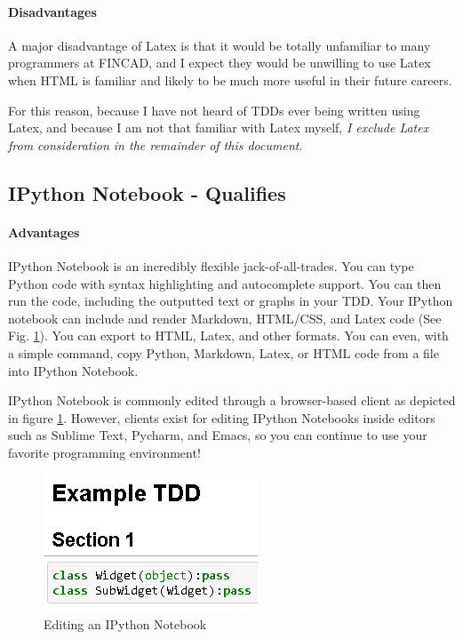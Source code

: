 \documentclass[]{article}
\begin{document}
	\paragraph{Disadvantages}	
	A major disadvantage of Latex is that it would be totally unfamiliar to many programmers at FINCAD, 
	and I expect they would be unwilling to use Latex when HTML is familiar and likely to be much more useful in their future careers.
	
	For this reason, because I have not heard of TDDs ever being written using Latex, and because I am not that familiar with Latex myself, 
	\emph{I exclude Latex from consideration in the remainder of this document}.


\subsection{IPython Notebook - Qualifies}
	\paragraph{Advantages}
		IPython Notebook is an incredibly flexible jack-of-all-trades.  
		You can type Python code with syntax highlighting and autocomplete support. 
		You can then run the code, including the outputted text or graphs in your TDD.  
		Your IPython notebook can include and render Markdown, HTML/CSS, and Latex code (See Fig. \ref{IPython}).  
		You can export to HTML, Latex, and other formats.  
		You can even, with a simple command, copy Python, Markdown, Latex, or HTML code from a file into IPython Notebook.
		
		IPython Notebook is commonly edited through a browser-based client as depicted in figure \ref{IPython}.  However, clients exist for editing IPython Notebooks inside editors such as Sublime Text, Pycharm, and Emacs, so you can continue to use your favorite programming environment!
		
		\begin{figure}[h]
			\centering
			\includegraphics[scale=.75]{IPython_Notebook.PNG}
			\caption{Editing an IPython Notebook}
			\label{IPython}
		\end{figure}
		
\end{document}
